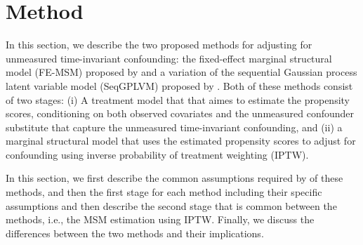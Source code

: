 \chapter{Method}
\label{sec:method}
In this section, we describe the two proposed methods 
for adjusting for unmeasured time-invariant confounding: the fixed-effect marginal 
structural model (FE-MSM) proposed by \cite{blackwellEffectPoliticalAdvertising2024}
and a variation of the sequential Gaussian process latent variable model (SeqGPLVM) 
proposed by \cite{hattSequentialDeconfoundingCausal2024}. Both of 
these methods consist of two stages:  
(i) A treatment model that that aimes to estimate the propensity scores, conditioning 
on both observed covariates and the unmeasured confounder substitute that 
capture the unmeasured time-invariant confounding,
and (ii) a marginal structural model that uses the estimated propensity scores to adjust for confounding 
using inverse probability of treatment weighting (IPTW). 

In this section, we first describe the common assumptions required by of these methods, and then the first stage for each method including 
their specific assumptions and then describe the second stage that is common between the methods, i.e., 
the MSM estimation using IPTW. 
Finally, we discuss the differences between the two methods and their implications.







